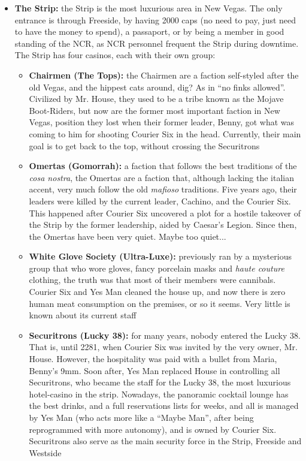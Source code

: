 \documentclass[11pt]{article} %
\begin{document}
\begin{itemize}
\item \textbf{The Strip:} the Strip is the most luxurious area in New Vegas. The only entrance is through Freeside, by having 2000 caps (no need to pay, just need to have the money to spend), a passaport, or by being a member in good standing of the NCR, as NCR personnel frequent the Strip during downtime. The Strip has four casinos, each with their own group:
	\begin{itemize}
	\item \textbf{Chairmen (The Tops):} the Chairmen are a faction self-styled after the old Vegas, and the hippest cats around, dig? As in ``no finks allowed''. Civilized by Mr. House, they used to be a tribe known as the Mojave Boot-Riders, but now are the former most important faction in New Vegas, position they lost when their former leader, Benny, got what was coming to him for shooting Courier Six in the head. Currently, their main goal is to get back to the top, without crossing the Securitrons
	\item \textbf{Omertas (Gomorrah):} a faction that follows the best traditions of the \textit{cosa nostra}, the Omertas are a faction that, although lacking the italian accent, very much follow the old \textit{mafioso} traditions. Five years ago, their leaders were killed by the current leader, Cachino, and the Courier Six. This happened after Courier Six uncovered a plot for a hostile takeover of the Strip by the former leadership, aided by Caesar's Legion. Since then, the Omertas have been very quiet. Maybe too quiet...
	\item \textbf{White Glove Society (Ultra-Luxe):} previously ran by a mysterious group that who wore gloves, fancy porcelain masks and \textit{haute couture} clothing, the truth was that most of their members were cannibals. Courier Six and Yes Man cleaned the house up, and now there is zero human meat consumption on the premises, or so it seems. Very little is known about its current staff
	\item \textbf{Securitrons (Lucky 38):} for many years, nobody entered the Lucky 38. That is, until 2281, when Courier Six was invited by the very owner, Mr. House. However, the hospitality was paid with a bullet from Maria, Benny's 9mm. Soon after, Yes Man replaced House in controlling all Securitrons, who became the staff for the Lucky 38, the most luxurious hotel-casino in the strip. Nowadays, the panoramic cocktail lounge has the best drinks, and a full reservations lists for weeks, and all is managed by Yes Man (who acts more like a ``Maybe Man'', after being reprogrammed with more autonomy), and is owned by Courier Six. Securitrons also serve as the main security force in the Strip, Freeside and Westside
	\end{itemize} 


\end{itemize}
\end{document}
